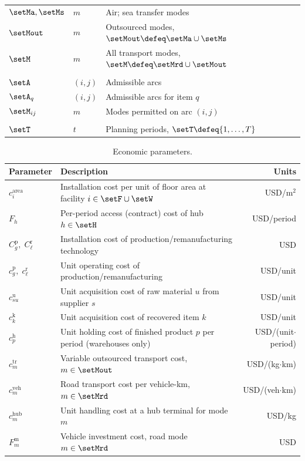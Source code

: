 \begin{table}[htbp]
\begin{tabular}{@{}lll@{}}
$\setMa,\setMs$ & $m$ & Air; sea transfer modes \\
$\setMout$ & $m$ & Outsourced modes, $\setMout\defeq\setMa\cup\setMs$ \\
$\setM$ & $m$ & All transport modes, $\setM\defeq\setMrd\cup\setMout$ \\
\addlinespace
\multicolumn{3}{@{}l}{Arcs} \\
$\setA$ & $(i,j)$ & Admissible arcs \\
$\setA_q$ & $(i,j)$ & Admissible arcs for item $q$ \\
$\setM_{ij}$ & $m$ & Modes permitted on arc $(i,j)$ \\
\addlinespace
\multicolumn{3}{@{}l}{Time} \\
$\setT$ & $t$ & Planning periods, $\setT\defeq\{1,\ldots,T\}$ \\
\bottomrule
\end{tabular}
\end{table}

\begin{table}[htbp]
\centering
\caption{Economic parameters.}
\label{tab:econ_params}
\footnotesize
\renewcommand{\arraystretch}{1.15}
\begin{tabular}{@{}llr@{}}
\toprule
Parameter & Description & Units \\
\midrule
$c^{\mathrm{area}}_i$ & Installation cost per unit of floor area at facility $i\in\setF\cup\setW$ & USD/m$^2$ \\
$F_h$ & Per-period access (contract) cost of hub $h\in\setH$ & USD/period \\
$C^{\mathrm{p}}_g,\;C^{\mathrm{r}}_{\ell}$ & Installation cost of production/remanufacturing technology & USD \\
$c^{\mathrm{p}}_g,\;c^{\mathrm{r}}_{\ell}$ & Unit operating cost of production/remanufacturing & USD/unit \\
$c^{\mathrm{u}}_{su}$ & Unit acquisition cost of raw material $u$ from supplier $s$ & USD/unit \\
$c^{\mathrm{k}}_k$ & Unit acquisition cost of recovered item $k$ & USD/unit \\
$c^{\mathrm{h}}_p$ & Unit holding cost of finished product $p$ per period (warehouses only) & USD/(unit$\cdot$period) \\
$c^{\mathrm{tr}}_m$ & Variable outsourced transport cost, $m\in\setMout$ & USD/(kg$\cdot$km) \\
$c^{\mathrm{veh}}_m$ & Road transport cost per vehicle-km, $m\in\setMrd$ & USD/(veh$\cdot$km) \\
$c^{\mathrm{hub}}_m$ & Unit handling cost at a hub terminal for mode $m$ & USD/kg \\
$F^{\mathrm{m}}_m$ & Vehicle investment cost, road mode $m\in\setMrd$ & USD \\
\bottomrule
\end{tabular}
\end{table}

